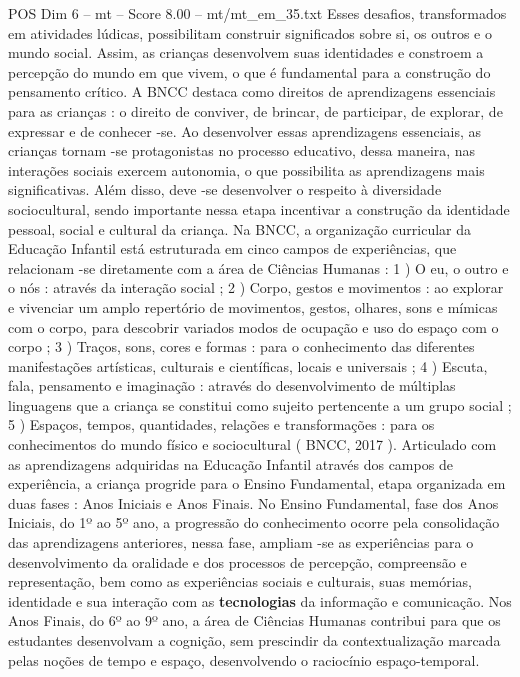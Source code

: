 \begin{textsample}{POS Dim 6 – mt – Score 8.00 – mt/mt\_em\_35.txt}
Esses desafios, transformados em atividades lúdicas, possibilitam construir significados sobre si, os outros e o mundo social.
Assim, as crianças desenvolvem suas identidades e constroem a percepção do mundo em que vivem, o que é fundamental para a construção do pensamento crítico.
A BNCC destaca como direitos de aprendizagens essenciais para as crianças : o direito de conviver, de brincar, de participar, de explorar, de expressar e de conhecer -se.
Ao desenvolver essas aprendizagens essenciais, as crianças tornam -se protagonistas no processo educativo, dessa maneira, nas interações sociais exercem autonomia, o que possibilita as aprendizagens mais significativas.
Além disso, deve -se desenvolver o respeito à diversidade sociocultural, sendo importante nessa etapa incentivar a construção da identidade pessoal, social e cultural da criança.
Na BNCC, a organização curricular da Educação Infantil está estruturada em cinco campos de experiências, que relacionam -se diretamente com a área de Ciências Humanas : 1 ) O eu, o outro e o nós : através da interação social ; 2 ) Corpo, gestos e movimentos : ao explorar e vivenciar um amplo repertório de movimentos, gestos, olhares, sons e mímicas com o corpo, para descobrir variados modos de ocupação e uso do espaço com o corpo ; 3 ) Traços, sons, cores e formas : para o conhecimento das diferentes manifestações artísticas, culturais e científicas, locais e universais ; 4 ) Escuta, fala, pensamento e imaginação : através do desenvolvimento de múltiplas linguagens que a criança se constitui como sujeito pertencente a um grupo social ; 5 ) Espaços, tempos, quantidades, relações e transformações : para os conhecimentos do mundo físico e sociocultural ( BNCC, 2017 ).
Articulado com as aprendizagens adquiridas na Educação Infantil através dos campos de experiência, a criança progride para o Ensino Fundamental, etapa organizada em duas fases : Anos Iniciais e Anos Finais.
No Ensino Fundamental, fase dos Anos Iniciais, do 1º ao 5º ano, a progressão do conhecimento ocorre pela consolidação das aprendizagens anteriores, nessa fase, ampliam -se as experiências para o desenvolvimento da oralidade e dos processos de percepção, compreensão e representação, bem como as experiências sociais e culturais, suas memórias, identidade e sua interação com as \textbf{tecnologias} da informação e comunicação.
Nos Anos Finais, do 6º ao 9º ano, a área de Ciências Humanas contribui para que os estudantes desenvolvam a cognição, sem prescindir da contextualização marcada pelas noções de tempo e espaço, desenvolvendo o raciocínio espaço-temporal.

\end{textsample}
